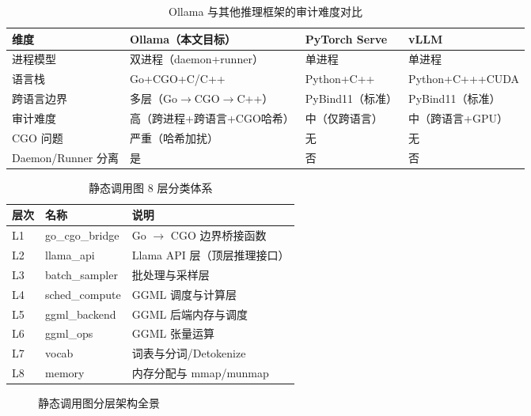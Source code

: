 \documentclass[12pt,a4paper]{ctexbook}
\begin{document}
\begin{table}[htbp]
\centering
\caption{Ollama 与其他推理框架的审计难度对比}
\label{tab:ollama_comparison}
\begin{tabular}{|p{3cm}|p{4.5cm}|p{4.5cm}|p{4.5cm}|}
\hline
\textbf{维度} & \textbf{Ollama（本文目标）} & \textbf{PyTorch Serve} & \textbf{vLLM} \\
\hline
进程模型 & 双进程（daemon+runner） & 单进程 & 单进程 \\
\hline
语言栈 & Go+CGO+C/C++ & Python+C++ & Python+C+++CUDA \\
\hline
跨语言边界 & 多层（Go$\rightarrow$CGO$\rightarrow$C++） & PyBind11（标准） & PyBind11（标准） \\
\hline
审计难度 & 高（跨进程+跨语言+CGO哈希） & 中（仅跨语言） & 中（跨语言+GPU） \\
\hline
CGO 问题 & 严重（哈希加扰） & 无 & 无 \\
\hline
Daemon/Runner 分离 & 是 & 否 & 否 \\
\hline
\end{tabular}
\end{table}
\newpage

\begin{table}[htbp]
\centering
\caption{静态调用图 8 层分类体系}
\label{tab:layer_classification}
\begin{tabular}{|p{1.5cm}|p{3cm}|p{7cm}|}
\hline
\textbf{层次} & \textbf{名称} & \textbf{说明} \\
\hline
L1 & go\_cgo\_bridge & Go $\rightarrow$ CGO 边界桥接函数 \\
\hline
L2 & llama\_api & Llama API 层（顶层推理接口） \\
\hline
L3 & batch\_sampler & 批处理与采样层 \\
\hline
L4 & sched\_compute & GGML 调度与计算层 \\
\hline
L5 & ggml\_backend & GGML 后端内存与调度 \\
\hline
L6 & ggml\_ops & GGML 张量运算 \\
\hline
L7 & vocab & 词表与分词/Detokenize \\
\hline
L8 & memory & 内存分配与 mmap/munmap \\
\hline
\end{tabular}
\end{table}
\newpage

\begin{figure}[htbp]
\centering
{}
\caption{静态调用图分层架构全景}
\label{fig:static_callgraph_overview}
\end{figure}
\newpage
\end{document}
